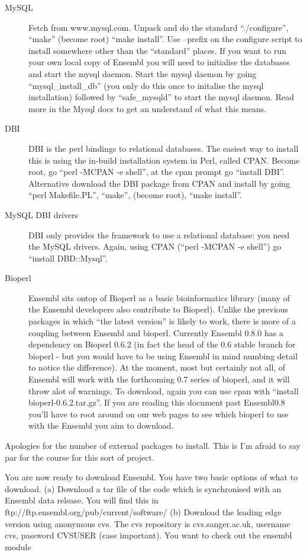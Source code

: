 \documentclass[11pt,a4paper]{article}
\begin{document}
\begin{description}
\item[MySQL] Fetch from www.mysql.com. Unpack and do the standard
``./configure'', ``make'' (become root) ``make install''. Use --prefix
on the configure script to install somewhere other than the
``standard'' places. If you want to run your own local copy of Ensembl
you will need to initialise the databases and start the mysql
daemon. Start the mysql daemon by going ``mysql\_install\_db'' (you
only do this once to initalise the mysql installation) followed by
``safe\_mysqld'' to start the mysql daemon. Read more in the Mysql
docs to get an understand of what this means.
\item[DBI] DBI is the perl bindings to relational databases. The easiest way to install
this is using the in-build installation system in Perl, called
CPAN. Become root, go ``perl -MCPAN -e shell'', at the cpan prompt go ``install DBI''.
Alternative download the DBI package from CPAN and install by going ``perl Makefile.PL'',
``make'', (become root), ``make install''.
\item[MySQL DBI drivers] DBI only provides the framework to use a relational database:
you need the MySQL drivers. Again, using CPAN (``perl -MCPAN -e shell'') go ``install DBD::Mysql''.
\item[Bioperl] Ensembl sits ontop of Bioperl as a basic bioinformatics library (many of the
Ensembl developers also contribute to Bioperl). Unlike the previous
packages in which ``the latest version'' is likely to work, there is
more of a coupling between Ensembl and bioperl. Currently Ensembl
0.8.0 has a dependency on Bioperl 0.6.2 (in fact the head of the 0.6
stable branch for bioperl - but you would have to be using Ensembl in
mind numbing detail to notice the difference).  At the moment, most
but certainly not all, of Ensembl will work with the forthcoming 0.7
series of bioperl, and it will throw alot of warnings. To download, again you can
use cpan with ``install bioperl-0.6.2.tar.gz''. If you are reading this document past Ensembl0.8
you'll have to root around on our web pages to see which bioperl to use with the Ensembl you aim
to download.
\end{description}

Apologies for the number of external packages to install. This is I'm afraid to say 
par for the course for this sort of project.

You are now ready to download Ensembl. You have two basic options of
what to download.  (a) Download a tar file of the code which is
synchronised with an Ensembl data release.  You will find this in
ftp://ftp.ensembl.org/pub/current/software/ (b) Download the leading
edge version using anonymous cvs. The cvs repository is
cvs.sanger.ac.uk, username cvs, password CVSUSER (case important). You
want to check out the ensembl module
\end{document}
